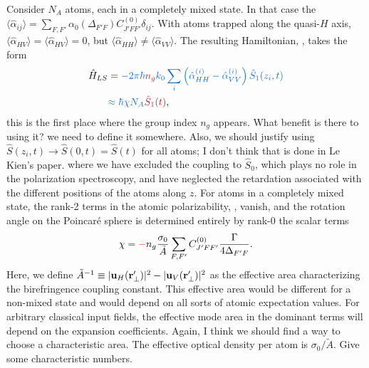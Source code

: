 \documentclass[preprint,aps,pra,onecolumn]{revtex4-1} %
\newcommand{\charpol}{\alpha_0(\Delta_{F'F})}
\newcommand{\change}[1]{{\color{RoyalBlue} #1}}
\newcommand{\comment}[1]{{\color{Maroon} #1}}
\newcommand{\error}[1]{{\color{red} #1}}
\begin{document}
Consider $N_A$ atoms, each in a completely mixed state.  \change{ In that case the $\langle \hat{\alpha}_{ij} \rangle = \sum_{F,F'} \charpol C_{J'FF'}^{(0)} \delta_{ij}$.  With atoms trapped along the quasi-$H$ axis, $\langle \hat{\alpha}_{HV} \rangle = \langle \hat{\alpha}_{HV} \rangle =0$, but  $\langle \hat{\alpha}_{HH} \rangle \neq  \langle \hat{\alpha}_{VV} \rangle$. } The resulting Hamiltonian, , takes the form
\begin{align}
\hat{H}_{LS} &= \change{-2\pi \hbar  \comment{n_g} k_0 \sum_i \left(\hat{\alpha}^{(i)}_{HH}  - \hat{\alpha}^{(i)}_{VV}\right)\hat{S}_1(z_i,t) } \\
	& \change{\approx \hbar \chi N_A \comment{ \hat{S}_1(t) } }, \label{Eq::MixedHamiltonian}
\end{align}
\comment{ this is the first place where the group index $n_g$ appears. What benefit is there to using it?  we need to define it somewhere.  Also, we should justify using $\hat{S}(z_i,t) \rightarrow \hat{S}(0,t) = \hat{S}(t) $ for all atoms; I don't think that is done in Le Kien's paper.}  where we have excluded the coupling to $\hat{S}_0$, which plays no role in the polarization spectroscopy, and have neglected the retardation associated with the different positions of the atoms along $z$.  \change{For atoms in a completely mixed state, the rank-2 terms in the atomic polarizability, \erf{Eq::PolarizabilityIrrep}, vanish, and the rotation angle on the Poincar\'{e} sphere is determined entirely by rank-0 the scalar terms}
\begin{equation} \label{Eq::RotationAngle}
\chi = \error{-}n_g  \frac{\sigma_0}{\tilde{A}}  \sum_{F,F'}  C_{J'FF'}^{(0)} \frac{\Gamma}{4 \Delta_{F'F}}.
\end{equation}
Here, we define $\tilde{A}^{-1} \equiv |\mathbf{u}_{H}(\mathbf{r}'_\perp)|^2 - |\mathbf{u}_{V}(\mathbf{r}'_\perp)| ^2 $ as the effective area characterizing the birefringence coupling constant. \comment{ This effective area would be different for a non-mixed state and would depend on all sorts of atomic expectation values.  For arbitrary classical input fields, the effective mode area in the dominant terms will depend on the expansion coefficients.  Again, I think we should find a way to choose a characteristic area.} The effective optical density per atom is $\sigma_0/\tilde{A}$.  {\color{red}  Give some characteristic numbers.}  
\end{document}
